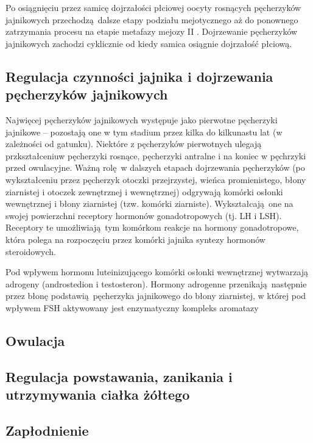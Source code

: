 \documentclass[two column, twoside, a4paper]{article}
\begin{document}
Po osiągnięciu przez samicę dojrzałości płciowej oocyty rosnących pęcherzyków jajnikowych przechodzą dalsze etapy podziału mejotycznego aż do ponownego zatrzymania procesu na etapie metafazy mejozy II \autocite{Sawicki2017}. Dojrzewanie pęcherzyków jajnikowych zachodzi cyklicznie od kiedy samica osiągnie dojrzałość płciową.

\subsection{Regulacja czynności jajnika i dojrzewania pęcherzyków jajnikowych}

Najwięcej pęcherzyków jajnikowych występuje jako pierwotne pęcherzyki jajnikowe -- pozostają one w tym stadium przez kilka do kilkunastu lat (w zależności od gatunku). Niektóre z pęcherzyków pierwotnych ulegają przkształceniuw pęcherzyki rosnące, pęcherzyki antralne i na koniec w pęchrzyki przed owulacyjne. Ważną rolę w dalszych etapach dojrzewania pęcherzyków (po wykształceniu przez pęcherzyk otoczki przejrzystej, wieńca promienistego, błony ziarnistej i otoczek zewnętrznej i wewnętrznej) odgrywają komórki osłonki wewnętrznej i błony ziarnistej (tzw. komórki ziarniste). Wykształcają one na swojej powierzchni receptory hormonów gonadotropowych (tj. LH i LSH). Receptory te umożliwiają tym komórkom reakcje na hormony gonadotropowe, która polega na rozpoczęciu przez komórki jajnika syntezy hormonów steroidowych. \autocite{Krzymowski2005}

Pod wpływem hormonu luteinizującego komórki osłonki wewnętrznej wytwarzają adrogeny (androstedion i testosteron). Hormony adrogenne przenikają następnie przez błonę podstawią pęcherzyka jajnikowego do błony ziarnistej, w której pod wpływem FSH aktywowany jest enzymatyczny kompleks aromatazy \autocite{erickson1978}

\subsection{Owulacja}

\blindtext
\subsection{Regulacja powstawania, zanikania i utrzymywania ciałka żółtego}

\blindtext
\subsection{Zapłodnienie}
\end{document}
